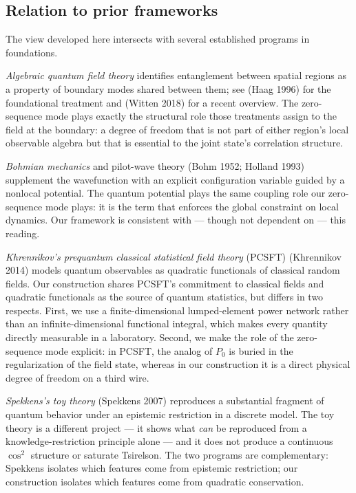 \documentclass[
  11pt]{article}
\begin{document}
\subsection{Relation to prior
frameworks}\label{relation-to-prior-frameworks}

The view developed here intersects with several established programs in
foundations.

\emph{Algebraic quantum field theory} identifies entanglement between
spatial regions as a property of boundary modes shared between them; see
(Haag 1996) for the foundational treatment and (Witten 2018) for a
recent overview. The zero-sequence mode plays exactly the structural
role those treatments assign to the field at the boundary: a degree of
freedom that is not part of either region's local observable algebra but
that is essential to the joint state's correlation structure.

\emph{Bohmian mechanics} and pilot-wave theory (Bohm 1952; Holland 1993)
supplement the wavefunction with an explicit configuration variable
guided by a nonlocal potential. The quantum potential plays the same
coupling role our zero-sequence mode plays: it is the term that enforces
the global constraint on local dynamics. Our framework is consistent
with --- though not dependent on --- this reading.

\emph{Khrennikov's prequantum classical statistical field theory}
(PCSFT) (Khrennikov 2014) models quantum observables as quadratic
functionals of classical random fields. Our construction shares PCSFT's
commitment to classical fields and quadratic functionals as the source
of quantum statistics, but differs in two respects. First, we use a
finite-dimensional lumped-element power network rather than an
infinite-dimensional functional integral, which makes every quantity
directly measurable in a laboratory. Second, we make the role of the
zero-sequence mode explicit: in PCSFT, the analog of \(P_0\) is buried
in the regularization of the field state, whereas in our construction it
is a direct physical degree of freedom on a third wire.

\emph{Spekkens's toy theory} (Spekkens 2007) reproduces a substantial
fragment of quantum behavior under an epistemic restriction in a
discrete model. The toy theory is a different project --- it shows what
\emph{can} be reproduced from a knowledge-restriction principle alone
--- and it does not produce a continuous \(\cos^2\) structure or
saturate Tsirelson. The two programs are complementary: Spekkens
isolates which features come from epistemic restriction; our
construction isolates which features come from quadratic conservation.
\end{document}

